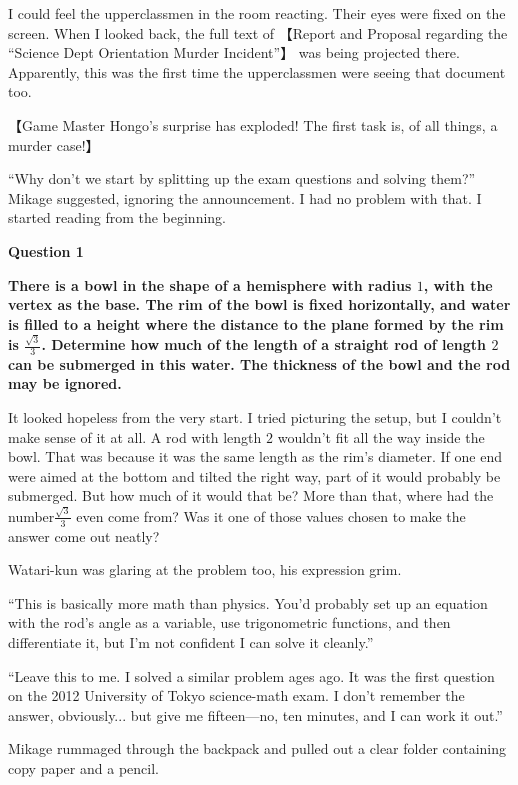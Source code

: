 \documentclass[
    a4paper,
    12pt,
    twoside,
    openany,
    UTF8,
    fontset=windows
]{ctexbook}
\begin{document}
I could feel the upperclassmen in the room reacting. Their eyes were fixed on the screen. When I looked back, the full text of 【Report and Proposal regarding the ``Science Dept Orientation Murder Incident''】 was being projected there. Apparently, this was the first time the upperclassmen were seeing that document too.

【Game Master Hongo's surprise has exploded! The first task is, of all things, a murder case!】

``Why don't we start by splitting up the exam questions and solving them?'' Mikage suggested, ignoring the announcement. I had no problem with that. I started reading from the beginning.

\begin{center}
\textbf{Question 1}
\end{center}

{\bfseries
There is a bowl in the shape of a hemisphere with radius $1$, with the vertex as the base. The rim of the bowl is fixed horizontally, and water is filled to a height where the distance to the plane formed by the rim is $\frac{\sqrt{3}}{3}$. Determine how much of the length of a straight rod of length $2$ can be submerged in this water. The thickness of the bowl and the rod may be ignored.
}

It looked hopeless from the very start. I tried picturing the setup, but I couldn't make sense of it at all. A rod with length $2$ wouldn't fit all the way inside the bowl. That was because it was the same length as the rim's diameter. If one end were aimed at the bottom and tilted the right way, part of it would probably be submerged. But how much of it would that be? More than that, where had the number$\frac{\sqrt{3}}{3}$ even come from? Was it one of those values chosen to make the answer come out neatly?

Watari-kun was glaring at the problem too, his expression grim.

``This is basically more math than physics. You'd probably set up an equation with the rod's angle as a variable, use trigonometric functions, and then differentiate it, but I'm not confident I can solve it cleanly.''

``Leave this to me. I solved a similar problem ages ago. It was the first question on the 2012 University of Tokyo science-math exam. I don't remember the answer, obviously... but give me fifteen---no, ten minutes, and I can work it out.''

Mikage rummaged through the backpack and pulled out a clear folder containing copy paper and a pencil.
\end{document}

